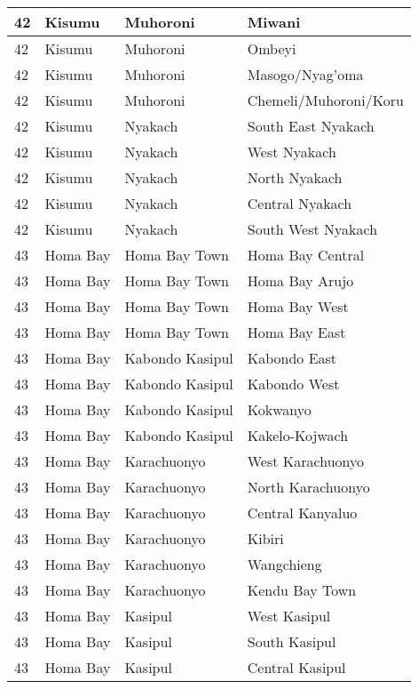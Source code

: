 \begin{table}[!ht]
\begin{tabular}{|l|l|l|l|}
        42 & Kisumu & Muhoroni & Miwani \\ \hline
        42 & Kisumu & Muhoroni & Ombeyi \\ \hline
        42 & Kisumu & Muhoroni & Masogo/Nyag’oma \\ \hline
        42 & Kisumu & Muhoroni & Chemeli/Muhoroni/Koru \\ \hline
        42 & Kisumu & Nyakach & South East Nyakach \\ \hline
        42 & Kisumu & Nyakach & West Nyakach \\ \hline
        42 & Kisumu & Nyakach & North Nyakach \\ \hline
        42 & Kisumu & Nyakach & Central Nyakach \\ \hline
        42 & Kisumu & Nyakach & South West Nyakach \\ \hline
        43 & Homa Bay & Homa Bay Town & Homa Bay Central \\ \hline
        43 & Homa Bay & Homa Bay Town & Homa Bay Arujo \\ \hline
        43 & Homa Bay & Homa Bay Town & Homa Bay West \\ \hline
        43 & Homa Bay & Homa Bay Town & Homa Bay East \\ \hline
        43 & Homa Bay & Kabondo Kasipul & Kabondo East \\ \hline
        43 & Homa Bay & Kabondo Kasipul & Kabondo West \\ \hline
        43 & Homa Bay & Kabondo Kasipul & Kokwanyo \\ \hline
        43 & Homa Bay & Kabondo Kasipul & Kakelo-Kojwach \\ \hline
        43 & Homa Bay & Karachuonyo & West Karachuonyo \\ \hline
        43 & Homa Bay & Karachuonyo & North Karachuonyo \\ \hline
        43 & Homa Bay & Karachuonyo & Central Kanyaluo \\ \hline
        43 & Homa Bay & Karachuonyo & Kibiri \\ \hline
        43 & Homa Bay & Karachuonyo & Wangchieng \\ \hline
        43 & Homa Bay & Karachuonyo & Kendu Bay Town \\ \hline
        43 & Homa Bay & Kasipul & West Kasipul \\ \hline
        43 & Homa Bay & Kasipul & South Kasipul \\ \hline
        43 & Homa Bay & Kasipul & Central Kasipul \\ \hline

\end{tabular}
\end{table}

